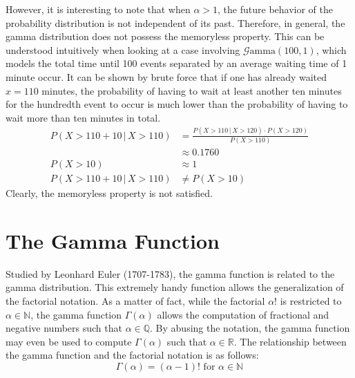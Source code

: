 \documentclass[12pt]{article}
\newcommand{\G}{\mathcal{G}}
\begin{document}
However, it is interesting to note that when $\alpha>1$, the future behavior of the probability distribution  is not
independent of its past. Therefore, in general, the gamma distribution does not possess the memoryless property. This
can be understood intuitively when looking at a case involving $\G\text{amma}(100, 1)$, which models the total time
until 100 events separated by an average waiting time of 1 minute occur. It can be shown by brute force that if one has
already waited $x=110$ minutes, the probability of having to wait at least another ten minutes for the hundredth event
to occur is much lower than the probability of having to wait more than ten minutes in total\cite{myersCS547Lecture,
probabilitycourseExponentialDistribution}.
\begin{equation}
	\begin{split}
		P(X>110+10\, |\, X>110)	&=			\frac{P(X>110\, |\, X>120)\cdot P(X>120)}{P(X>110)}\\
								&\approx	0.1760\\
		P(X>10)					&\approx	1\\
		P(X>110+10\, |\, X>110)	&\neq		P(X>10)
	\end{split}
\end{equation}
Clearly, the memoryless property is not satisfied.


\pagebreak
\section{The Gamma Function}
\vspace*{-6pt}
Studied by Leonhard Euler (1707-1783), the gamma function is related to the gamma distribution. This extremely handy
function allows the generalization of the factorial notation. As a matter of fact, while the factorial $\alpha!$ is
restricted to $\alpha\in\mathbb{N}$, the gamma function $\Gamma(\alpha)$ allows the computation of fractional and
negative numbers such that $\alpha\in\mathbb{Q}$. By abusing the notation, the gamma function may even be used to
compute $\Gamma(\alpha)$ such that $\alpha\in\mathbb{R}$. The relationship between the gamma function and the factorial
notation is as follows:
\vspace*{-18pt}
\begin{equation}\label{eq:gammafunction:factorial}
	\Gamma(\alpha)=(\alpha-1)!\text{ for }\alpha\in\mathbb{N}
\end{equation}
\vspace*{-60pt}
\end{document}
